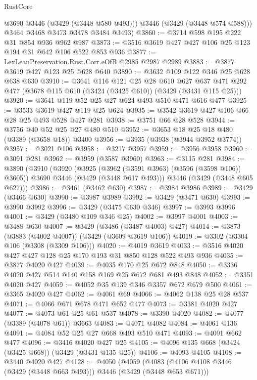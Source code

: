 \begin{lexlean}{RustCore}
\begin{coremodule}
          @3690
          @3446
          (@3429 (@3448 @580 @493)))
        @3446
        (@3429 (@3448 @574 @588)))
      @3464
      @3468
      @3473
      @3478
      @3484
      @3493)
@3860 := @3714 @598 @195 @222 @31 @854 @936 @962 @987
@3873 := @3516 @3619 @427 @427 @106 @25 @123 @194 @31 @642 @106 @522 @853 @936
@3877 := LexLeanPreservation.Rust.Corr.eOfB @2985 @2987 @2989
@3883 := @3877 @3619 @427 @123 @25 @628 @640
@3890 := @3632 @109 @122 @346 @25 @628 @638 @630
@3910 := @3641
    @116
    @121
    @25
    @28
    @610
    @627
    @637
    @471
    @292
    @477
    (@3678 @115 @610 (@3424 (@3425 @610)) (@3429 (@3431 @115 @25)))
@3920 := @3641 @119 @52 @25 @27 @624 @493 @510 @471 @616 @477
@3925 := @3533 @3619 @427 @119 @25 @624
@3935 := @3542 @3619 @427 @106 @66 @28 @25 @493 @528 @427 @281
@3938 := @3751 @66 @28 @528
@3944 := @3756 @40 @52 @25 @27 @480 @510
@3952 := @3653 @18 @25 @18 @480 (@3389 (@3658 @18)) @3400
@3956 := @3935 (@3938 (@3944 @3952 @3774))
@3957 := @3021 @106
@3958 := @3217 @3957
@3959 := @3956 @3958
@3960 := @3091 @281
@3962 := @3959 (@3587 @3960)
@3963 := @3115 @281
@3984 := @3890
    (@3910
      (@3920
        (@3925 (@3962 (@3591 @3963) (@3596 (@3598 @106)) @3605))
        @3690
        @3446
        (@3429 (@3448 @617 @493)))
      @3446
      (@3429 (@3448 @605 @627)))
@3986 := @3461 (@3462 @630)
@3987 := @3984 @3986
@3989 := @3429 (@3466 @630)
@3990 := @3987 @3989
@3992 := @3429 (@3471 @630)
@3993 := @3990 @3992
@3996 := @3429 (@3475 @630 @346)
@3997 := @3993 @3996
@4001 := @3429 (@3480 @109 @346 @25)
@4002 := @3997 @4001
@4003 := @3488 @630
@4007 := @3429 (@3486 (@3487 @4003) @427)
@4014 := @3873 (@3883 (@4002 @4007)) (@3429 (@3609 @3619 @106))
@4019 := @3302 (@3304 @106 (@3308 (@3309 @106)))
@4020 := @4019 @3619
@4033 := @3516 @4020 @427 @427 @128 @25 @170 @193 @31 @850 @128 @522 @493 @936
@4035 := @3877 @4020 @427
@4039 := @4035 @170 @25 @672 @848
@4050 := @3336 @4020 @427 @514 @140 @158 @169 @25 @672 @681 @493 @848
@4052 := @3351 @4020 @427
@4059 := @4052 @35 @139 @346 @3357 @672 @679 @500
@4061 := @3365 @4020 @427
@4062 := @4061 @69
@4066 := @4062 @138 @25 @28 @537
@4071 := @4066 @671 @678 @471 @652 @477
@4073 := @3381 @4020 @427
@4077 := @4073 @61 @25 @61 @537
@4078 := @3390 @4020
@4082 := @4077 (@3389 (@4078 @61)) @3663
@4083 := @4071 @4082
@4084 := @4061 @136
@4091 := @4084 @52 @25 @27 @668 @493 @510 @471
@4093 := @4091 @662 @477
@4096 := @3416 @4020 @427 @25
@4105 := @4096 @135 @668 (@3424 (@3425 @668)) (@3429 (@3431 @135 @25))
@4106 := @4093 @4105
@4108 := @3440 @4020 @427
@4128 := @4050
    (@4059
      (@4083 (@4106 @4108 @3446 (@3429 (@3448 @663 @493))) @3446 (@3429 (@3448 @653 @671)))

\end{coremodule}
\end{lexlean}
